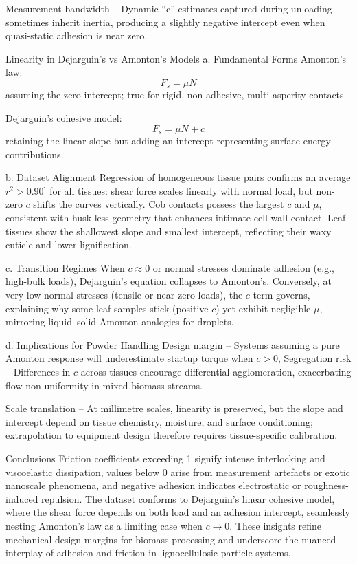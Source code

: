 \documentclass[xcolor=dvipsnames,10pt,hidelinks]{article}
\begin{document}
\begin{itemize}
Measurement bandwidth – Dynamic “c” estimates captured during unloading sometimes inherit inertia, producing a slightly negative intercept even when quasi-static adhesion is near zero.

Linearity in Dejarguin’s vs Amonton’s Models
a. Fundamental Forms
Amonton’s law:
\[F_s = \mu N\]
 assuming the zero intercept; true for rigid, non-adhesive, multi-asperity contacts.

Dejarguin’s cohesive model:
\[F_s = \mu N + c\]
retaining the linear slope but adding an intercept representing surface energy contributions.

b. Dataset Alignment
Regression of homogeneous tissue pairs confirms an average \(r^2 > 0.90]\) for all tissues: shear force scales linearly with normal load, but non-zero \(c\) shifts the curves vertically. Cob contacts possess the largest \(c\) and \(\mu\), consistent with husk-less geometry that enhances intimate cell-wall contact. Leaf tissues show the shallowest slope and smallest intercept, reflecting their waxy cuticle and lower lignification.

c. Transition Regimes
When \(c\approx 0\) or normal stresses dominate adhesion (e.g., high-bulk loads), Dejarguin’s equation collapses to Amonton’s. Conversely, at very low normal stresses (tensile or near-zero loads), the \(c\) term governs, explaining why some leaf samples stick (positive \(c\)) yet exhibit negligible \(\mu\), mirroring liquid–solid Amonton analogies for droplets.

d. Implications for Powder Handling
Design margin – Systems assuming a pure Amonton response will underestimate startup torque when \(c > 0\),
Segregation risk – Differences in \(c\) across tissues encourage differential agglomeration, exacerbating flow non-uniformity in mixed biomass streams.

Scale translation – At millimetre scales, linearity is preserved, but the slope and intercept depend on tissue chemistry, moisture, and surface conditioning; extrapolation to equipment design therefore requires tissue-specific calibration.

Conclusions
Friction coefficients exceeding 1 signify intense interlocking and viscoelastic dissipation, values below 0 arise from measurement artefacts or exotic nanoscale phenomena, and negative adhesion indicates electrostatic or roughness-induced repulsion.
The dataset conforms to Dejarguin’s linear cohesive model, where the shear force depends on both load and an adhesion intercept, seamlessly nesting Amonton’s law as a limiting case when \(c \to 0\).
These insights refine mechanical design margins for biomass processing and underscore the nuanced interplay of adhesion and friction in lignocellulosic particle systems.
\endgroup
\newpage
\end{itemize}
\end{document}
